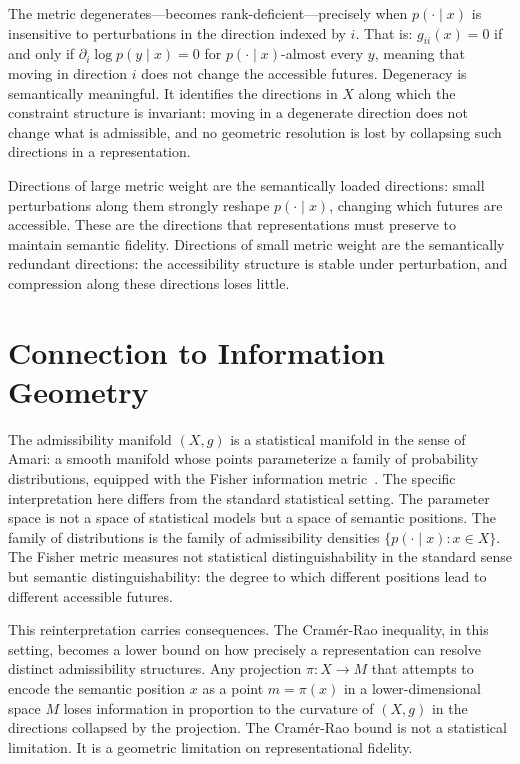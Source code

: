 \documentclass[12pt, oneside]{book}
\theoremstyle{plain-flyxion}
\theoremstyle{definition-flyxion}
\begin{document}
The metric degenerates---becomes rank-deficient---precisely when $p(\cdot\mid x)$ is
insensitive to perturbations in the direction indexed by $i$. That is: $g_{ii}(x)=0$
if and only if $\partial_i \log p(y\mid x) = 0$ for $p(\cdot\mid x)$-almost every $y$,
meaning that moving in direction $i$ does not change the accessible futures. Degeneracy
is semantically meaningful. It identifies the directions in $X$ along which the
constraint structure is invariant: moving in a degenerate direction does not change what
is admissible, and no geometric resolution is lost by collapsing such directions in a
representation.

Directions of large metric weight are the semantically loaded directions: small
perturbations along them strongly reshape $p(\cdot\mid x)$, changing which futures are
accessible. These are the directions that representations must preserve to maintain
semantic fidelity. Directions of small metric weight are the semantically redundant
directions: the accessibility structure is stable under perturbation, and compression
along these directions loses little.

\section{Connection to Information Geometry}

The admissibility manifold $(X, g)$ is a statistical manifold in the sense of Amari: a
smooth manifold whose points parameterize a family of probability distributions, equipped
with the Fisher information metric~\cite{amari2016information}. The specific interpretation
here differs from the standard statistical setting. The parameter space is not a space of
statistical models but a space of semantic positions. The family of distributions is the
family of admissibility densities $\{p(\cdot\mid x) : x\in X\}$. The Fisher metric
measures not statistical distinguishability in the standard sense but semantic
distinguishability: the degree to which different positions lead to different accessible
futures.

This reinterpretation carries consequences. The Cramér-Rao inequality, in this setting,
becomes a lower bound on how precisely a representation can resolve distinct admissibility
structures. Any projection $\pi: X\to M$ that attempts to encode the semantic position
$x$ as a point $m=\pi(x)$ in a lower-dimensional space $M$ loses information in
proportion to the curvature of $(X,g)$ in the directions collapsed by the projection.
The Cramér-Rao bound is not a statistical limitation. It is a geometric limitation on
representational fidelity.
\end{document}
